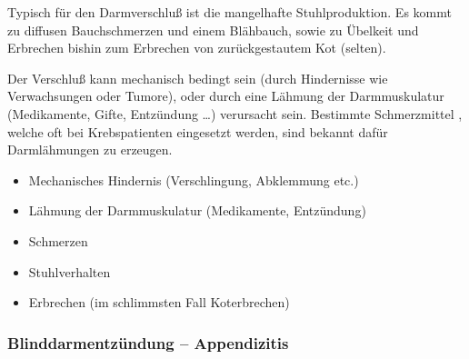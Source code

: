 \gMarried
{Typisch für den Darmverschluß ist die mangelhafte
Stuhlproduktion. Es kommt zu diffusen Bauchschmerzen und einem
Blähbauch, sowie zu Übelkeit und Erbrechen bishin zum
Erbrechen von zurückgestautem Kot (selten).

Der Verschluß kann mechanisch bedingt sein (durch
Hindernisse wie Verwachsungen oder Tumore), oder durch eine
Lähmung der Darmmuskulatur (Medikamente, Gifte, Entzündung
\ldots) verursacht sein. Bestimmte Schmerzmittel
, welche oft bei Krebspatienten eingesetzt
werden, sind bekannt dafür Darmlähmungen zu erzeugen. }
{

\begin{itemize}
\item Mechanisches Hindernis (Verschlingung, Abklemmung 
etc.)
\item Lähmung der Darmmuskulatur (Medikamente, Entzündung)
\end{itemize}


\begin{itemize}
\item Schmerzen
\item Stuhlverhalten
\item Erbrechen (im schlimmsten Fall Koterbrechen)
\end{itemize}}




\subsubsection{Blinddarmentzündung -- Appendizitis}





